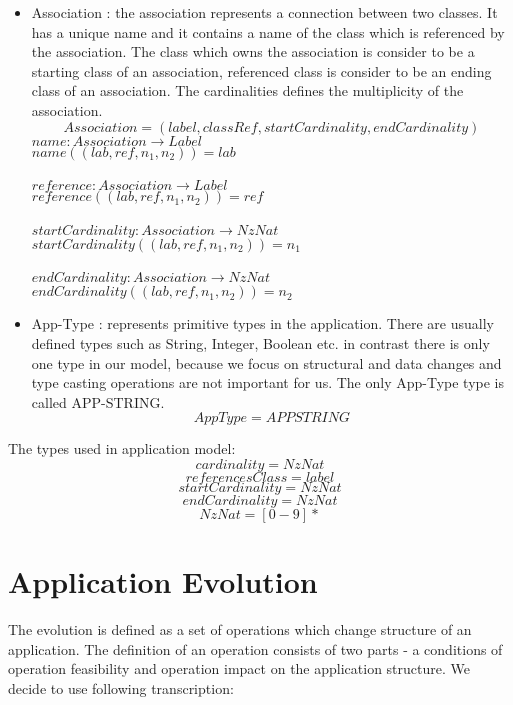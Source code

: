 \documentclass[11pt]{article}
\begin{document}
\begin{itemize}
	\item Association : the association represents a connection between two classes. It has a unique name and it contains a name of the class which is referenced by the association. The class which owns the association is consider to be a starting class of an association, referenced class is consider to be an ending class of an association. The cardinalities defines the multiplicity of the association.
$$
Association = (label, classRef, startCardinality, endCardinality)
$$
$name : Association \rightarrow Label$ \\
$name((lab, ref, n_1, n_2)) = lab$\\ \\
$reference : Association \rightarrow Label$ \\
$reference((lab, ref, n_1, n_2)) = ref$\\ \\
$startCardinality : Association \rightarrow NzNat$ \\
$startCardinality((lab, ref, n_1, n_2)) = n_1$\\ \\
$endCardinality : Association \rightarrow NzNat$ \\
$endCardinality((lab, ref, n_1, n_2)) = n_2$

	\item App-Type : represents primitive types in the application. There are usually defined types such as String, Integer, Boolean etc. in contrast there is only one type in our model, because we focus on structural and data changes and type casting operations are not important for us. The only App-Type type is called APP-STRING.
$$
AppType = APPSTRING
$$
\end{itemize}
The types used in application model:
$$
cardinality = NzNat
$$
$$
referencesClass = label
$$
$$
startCardinality = NzNat
$$
$$
endCardinality = NzNat
$$
$$
NzNat = [0 - 9]*
$$




\section{Application Evolution}
\label{sec:appEvolution}

The evolution is defined as a set of operations which change structure of an application. The definition of an operation consists of two parts - a conditions of operation feasibility and operation impact on the application structure. We decide to use following transcription:
\end{document}
